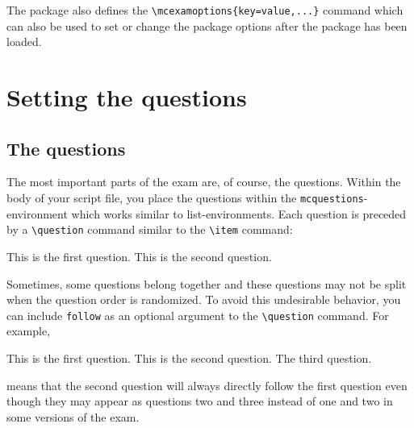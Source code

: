 \documentclass{article}
\begin{document}
The package also defines the \verb$\mcexamoptions{key=value,...}$ command which can also be used to set or change the package options after the package has been loaded.




















\section{Setting the questions}


\subsection{The questions}

The most important parts of the exam are, of course, the questions. Within the body of your script file, you place the questions within the \verb$mcquestions$-environment which works similar to list-environments. Each question is preceded by a \verb$\question$ command similar to the \verb$\item$ command:
\begin{code}
\begin{mcquestions}
\question This is the first question.
\question This is the second question.
\end{mcquestions}
\end{code}

Sometimes, some questions belong together and these questions may not be split when the question order is randomized. To avoid this undesirable behavior, you can include \verb$follow$ as an optional argument to the \verb$\question$ command. For example, 
\begin{code}
\begin{mcquestions}
\question This is the first question.
\question[follow] This is the second question.
\question The third question.
\end{mcquestions}
\end{code}
means that the second question will always directly follow the first question even though they may appear as questions two and three instead of one and two in some versions of the exam.
\end{document}
